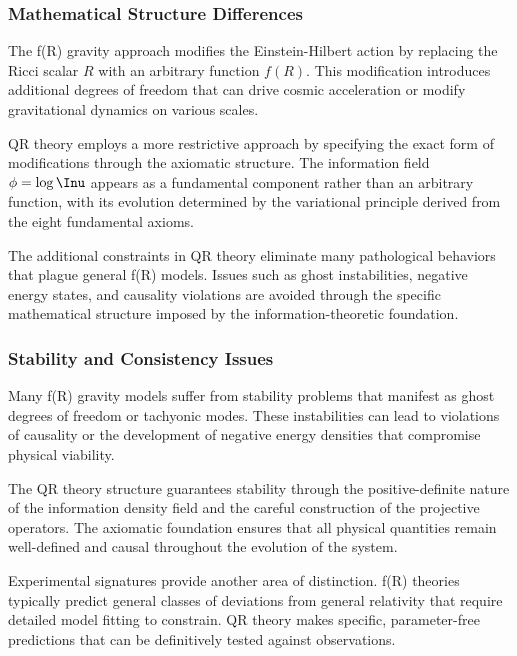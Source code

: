 
\subsubsection{Mathematical Structure Differences}
\label{subsubsec:mathematical-fr}

The f(R) gravity approach modifies the Einstein-Hilbert action by replacing the Ricci scalar $R$ with an arbitrary function $f(R)$. This modification introduces additional degrees of freedom that can drive cosmic acceleration or modify gravitational dynamics on various scales.

QR theory employs a more restrictive approach by specifying the exact form of modifications through the axiomatic structure. The information field $\phi = \log \Inu$ appears as a fundamental component rather than an arbitrary function, with its evolution determined by the variational principle derived from the eight fundamental axioms.

The additional constraints in QR theory eliminate many pathological behaviors that plague general f(R) models. Issues such as ghost instabilities, negative energy states, and causality violations are avoided through the specific mathematical structure imposed by the information-theoretic foundation.

\subsubsection{Stability and Consistency Issues}
\label{subsubsec:stability-fr}

Many f(R) gravity models suffer from stability problems that manifest as ghost degrees of freedom or tachyonic modes. These instabilities can lead to violations of causality or the development of negative energy densities that compromise physical viability.

The QR theory structure guarantees stability through the positive-definite nature of the information density field and the careful construction of the projective operators. The axiomatic foundation ensures that all physical quantities remain well-defined and causal throughout the evolution of the system.

Experimental signatures provide another area of distinction. f(R) theories typically predict general classes of deviations from general relativity that require detailed model fitting to constrain. QR theory makes specific, parameter-free predictions that can be definitively tested against observations.

